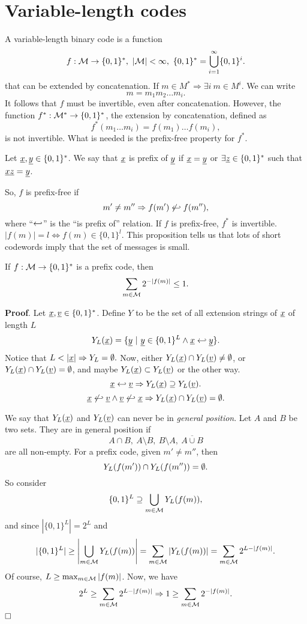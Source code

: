 \chapter{Variable-length codes}

A variable-length binary code is a function 
\[f:\mathcal{M} \rightarrow \{0, 1\}^*,\ |\mathcal{M}| < \infty,\ \{0, 1\}^* = \bigcup_{i = 1}^\infty \{0, 1\}^i.
\]
that can be extended by concatenation. If $m \in M^* \Rightarrow \exists i\ m \in M^i$. We can write $$m = m_1m_2\ldots m_i.$$ It follows that $f$ must be invertible, even after concatenation. However, the function $f^*:\mathcal{M}^* \rightarrow \{0, 1\}^*$, the extension by concatenation, defined as $$f^*(m_1\ldots m_i) = f(m_1)\ldots f(m_i),$$ is not invertible. What is needed is the prefix-free property for $f^*$.

Let $\underline{x}, \underline{y} \in \{0, 1\}^*$. We say that $\underline{x}$ is prefix of $\underline{y}$ if $\underline{x} = \underline{y}$ or $\exists \underline{z} \in \{0, 1\}^*$ such that $\underline{x}\underline{z} = \underline{y}$.

 So, $f$ is prefix-free if $$m'\not=m'' \Rightarrow f(m') \not\hookleftarrow f(m''),$$ where ``$\hookleftarrow$'' is the ``is prefix of'' relation. If $f$ is prefix-free, $f^*$ is invertible. $|f(m)| = l \Leftrightarrow f(m) \in \{0, 1\}^l$. This proposition tells us that lots of short codewords imply that the set of messages is small.

\begin{prop}\label{prop:kraft}
	If $f:\mathcal{M} \rightarrow \{0, 1\}^*$ is a prefix code, then $$\sum_{m\in\mathcal{M}}2^{-|f(m)|}\leq 1.$$
\end{prop}

\noindent\textbf{Proof}. Let $\underline{x}, \underline{v} \in \{0, 1\}^*$. Define $Y$ to be the set of all extension strings of $\underline{x}$ of length $L$
$$Y_L(\underline{x}) = \{\underline{y}\ |\ \underline{y} \in \{0, 1\}^L \wedge \underline{x} \hookleftarrow \underline{y} \}.$$
Notice that $L < |\underline{x}| \Rightarrow Y_L = \emptyset.$ Now, either $Y_L(\underline{x}) \cap Y_L(\underline{v}) \not= \emptyset$, or $Y_L(\underline{x}) \cap Y_L(\underline{v}) = \emptyset$, and maybe $Y_L(\underline{x}) \subset Y_L(\underline{v})$ or the other way. 
$$\underline{x} \hookleftarrow \underline{v} \Rightarrow Y_L(\underline{x}) \supseteq Y_L(\underline{v}).$$
$$\underline{x} \not\hookleftarrow \underline{v} \wedge \underline{v} \not\hookleftarrow \underline{x} \Rightarrow Y_L(\underline{x}) \cap Y_L(\underline{v}) = \emptyset.$$

We say that $Y_L(\underline{x})$ and $Y_L(\underline{v})$ can never be in \emph{general position}. Let $A$ and  $B$ be two sets. They are in general position if $$A\cap B,\ A \setminus B,\ B \setminus A,\ \overline{A\cup B}$$ are all non-empty. For a prefix code, given $m'\not= m''$, then $$Y_L(f(m')) \cap Y_L(f(m'')) = \emptyset.$$ So consider $$\{0, 1\}^L \supseteq \bigcup_{m \in\mathcal{M}}Y_L(f(m)),$$ and since $|\{0, 1\}^L| = 2^L$ and $$|\{0, 1\}^L| \geq \left|\bigcup_{m\in\mathcal{M}}Y_L(f(m))\right| = \sum_{m\in\mathcal{M}} |Y_L(f(m))| = \sum_{m \in \mathcal{M}} 2^{L - |f(m)|}.$$ Of course, $L \geq \max_{m \in \mathcal{M}} |f(m)|$. Now, we have
$$2^L \geq \sum_{m\in\mathcal{M}}2^{L - |f(m)|} \Rightarrow 1 \geq \sum_{m\in\mathcal{M}} 2^{-|f(m)|}.$$
$\hfill\Box$


